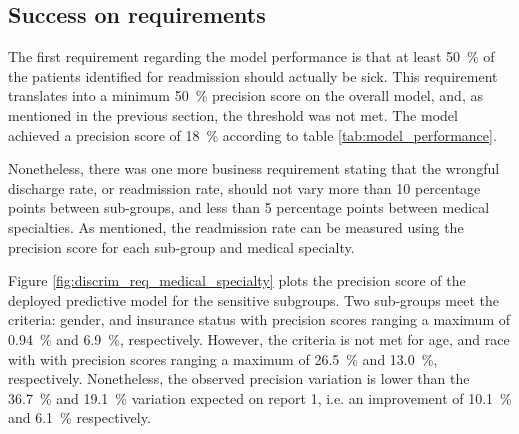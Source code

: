 \documentclass[a4paper,11pt]{article}
\begin{document}
\subsection{Success on requirements}
\label{section:success_requirements}

The first requirement regarding the model performance is that at least \SI{50}{\percent} of the patients identified for readmission should actually be sick. This requirement translates into a minimum \SI{50}{\percent} precision score on the overall model, and, as mentioned in the previous section, the threshold was not met. The model achieved a precision score of \SI{18}{\percent} according to table \ref{tab:model_performance}.

Nonetheless, there was one more business requirement stating that the wrongful discharge rate, or readmission rate, should not vary more than 10 percentage points between sub-groups, and less than 5 percentage points between medical specialties. As mentioned, the readmission rate can be measured using the precision score for each sub-group and medical specialty.

Figure \ref{fig:discrim_req_medical_specialty} plots the precision score of the deployed predictive model for the sensitive subgroups. Two sub-groups meet the criteria: gender, and insurance status with precision scores ranging a maximum of \SI{0.94}{\percent} and \SI{6.9}{\percent}, respectively. However, the criteria is not met for age, and race with with precision scores ranging a maximum of \SI{26.5}{\percent} and \SI{13.0}{\percent}, respectively. Nonetheless, the observed precision variation is lower than the \SI{36.7}{\percent} and \SI{19.1}{\percent} variation expected on report 1, i.e. an improvement of \SI{10.1}{\percent} and \SI{6.1}{\percent} respectively.

\end{document}
